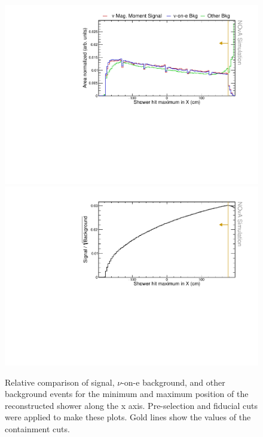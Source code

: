 \begin{figure}[hbtp]
\centering
\includegraphics[width=.9\textwidth]{Plots/NuMMEventSelection/N1Cut_maxX.pdf}
\includegraphics[width=.9\textwidth]{Plots/NuMMEventSelection/NuMM_N1Cut_maxXleft_FOMStats}
\caption{Relative comparison of signal, $\nu$-on-e background, and other background events for the minimum and maximum position of the reconstructed shower along the x axis. Pre-selection and fiducial cuts were applied to make these plots. Gold lines show the values of the containment cuts.}
\label{fig:NuMMContainmentCutMaxX}
\end{figure}

